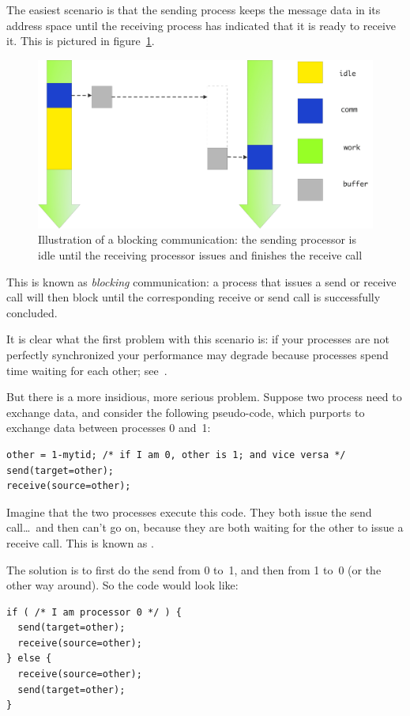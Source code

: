 The easiest scenario is that the sending process keeps the message
data in its address space until the receiving process has indicated
that it is ready to receive it. This is pictured in
figure~\ref{fig:send-blocking}.
\begin{figure}[ht]
\includegraphics[scale=.1]{graphics-public/send-blocking}
\caption{Illustration of a blocking communication: the sending processor is idle until the receiving processor issues and finishes the receive call}
\label{fig:send-blocking}
\end{figure}
This is known as \emph{blocking} communication: a process that issues
a send or receive call will then block until the corresponding receive
or send call is successfully concluded.

It is clear what the first problem with this scenario is: if your
processes are not perfectly synchronized your performance may degrade
because processes spend time waiting for each other;
see~. 

But there is a more insidious, more serious problem.
Suppose two process need to exchange data, and consider the following
pseudo-code, which purports to exchange data between processes 0 and~1:
\begin{verbatim}
other = 1-mytid; /* if I am 0, other is 1; and vice versa */
send(target=other);
receive(source=other);
\end{verbatim}
Imagine that the two processes execute this code. They both issue the
send call\ldots\ and then can't go on, because they are both waiting
for the other to issue a receive call. This is known
as .

The solution is to first do the send from 0 to~1, and then from 1 to~0 (or the other way around). So the code would look like:
\begin{verbatim}
if ( /* I am processor 0 */ ) {
  send(target=other);
  receive(source=other);
} else {
  receive(source=other);
  send(target=other);
}
\end{verbatim}

